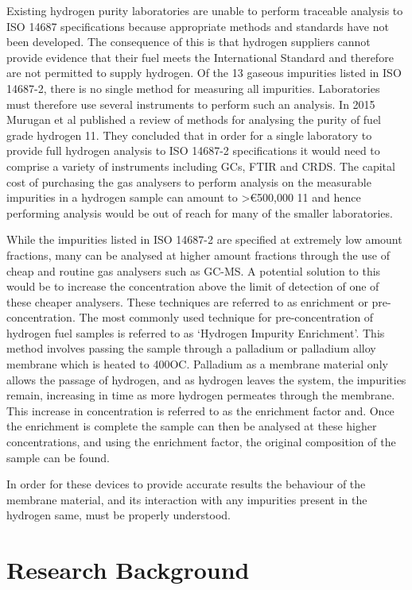 \documentclass{report}
\begin{document}
Existing hydrogen purity laboratories are unable to perform traceable analysis to ISO 14687 specifications because appropriate methods and standards have not been developed. The consequence of this is that hydrogen suppliers cannot provide evidence that their fuel meets the International Standard and therefore are not permitted to supply hydrogen. Of the 13 gaseous impurities listed in ISO 14687-2, there is no single method for measuring all impurities. Laboratories must therefore use several instruments to perform such an analysis.  In 2015 Murugan et al published a review of methods for analysing the purity of fuel grade hydrogen 11. They concluded that in order for a single laboratory to provide full hydrogen analysis to ISO 14687-2 specifications it would need to comprise a variety of instruments including GCs, FTIR and CRDS. The capital cost of purchasing the gas analysers to perform analysis on the measurable impurities in a hydrogen sample can amount to >€500,000 11 and hence performing analysis would be out of reach for many of the smaller laboratories. 

While the impurities listed in ISO 14687-2 are specified at extremely low amount fractions, many can be analysed at higher amount fractions through the use of cheap and routine gas analysers such as GC-MS. A potential solution to this would be to increase the concentration above the limit of detection of one of these cheaper analysers. These techniques are referred to as enrichment or pre-concentration. The most commonly used technique for pre-concentration of hydrogen fuel samples is referred to as ‘Hydrogen Impurity Enrichment’.  This method involves passing the sample through a palladium or palladium alloy membrane which is heated to 400OC. Palladium as a membrane material only allows the passage of hydrogen, and as hydrogen leaves the system, the impurities remain, increasing in time as more hydrogen permeates through the membrane.  This increase in concentration is referred to as the enrichment factor and. Once the enrichment is complete the sample can then be analysed at these higher concentrations, and using the enrichment factor, the original composition of the sample can be found. 

In order for these devices to provide accurate results the behaviour of the membrane material, and its interaction with any impurities present in the hydrogen same, must be properly understood.  


\section{Research Background}
\end{document}
